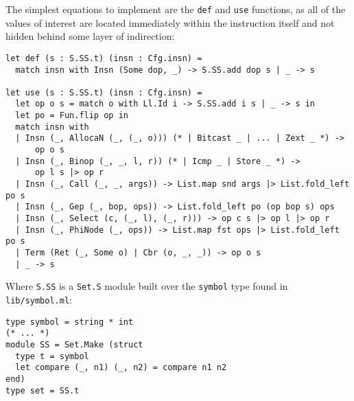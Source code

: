 \documentclass{article}
\begin{document}









The simplest equations to implement are the \lstinline!def! and \lstinline!use! functions, as all of the values of interest are located immediately within the instruction itself and not hidden behind some layer of indirection:
\begin{verbatim}
let def (s : S.SS.t) (insn : Cfg.insn) =
  match insn with Insn (Some dop, _) -> S.SS.add dop s | _ -> s

let use (s : S.SS.t) (insn : Cfg.insn) =
  let op o s = match o with Ll.Id i -> S.SS.add i s | _ -> s in
  let po = Fun.flip op in
  match insn with
  | Insn (_, AllocaN (_, (_, o))) (* | Bitcast _ | ... | Zext _ *) ->
      op o s
  | Insn (_, Binop (_, _, l, r)) (* | Icmp _ | Store _ *) ->
      op l s |> op r
  | Insn (_, Call (_, _, args)) -> List.map snd args |> List.fold_left po s
  | Insn (_, Gep (_, bop, ops)) -> List.fold_left po (op bop s) ops
  | Insn (_, Select (c, (_, l), (_, r))) -> op c s |> op l |> op r
  | Insn (_, PhiNode (_, ops)) -> List.map fst ops |> List.fold_left po s
  | Term (Ret (_, Some o) | Cbr (o, _, _)) -> op o s
  | _ -> s
\end{verbatim}
Where \lstinline!S.SS! is a \lstinline!Set.S! module built over the \lstinline!symbol! type found in \lstinline!lib/symbol.ml!:
\begin{verbatim}
type symbol = string * int
(* ... *)
module SS = Set.Make (struct
  type t = symbol
  let compare (_, n1) (_, n2) = compare n1 n2
end)
type set = SS.t
\end{verbatim}
\end{document}
